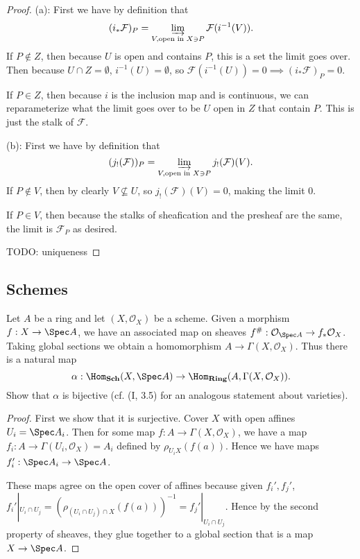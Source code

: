 \begin{proof}
	(a): First we have by definition that
	\[
		(i_\ast \mathcal{F})_P = \varinjlim_{V, \text{open in $X $} \ni P} \mathcal{F}(i^{-1}(V))
	.\] 
	If $P\notin Z $, then because $U $ is open and contains $P $, this is a set the limit goes over.
	Then because $U\cap Z = \emptyset $, $i^{-1}(U) = \emptyset $, so $\mathcal{F}(i^{-1}(U)) = 0 \implies (i_\ast \mathcal{F})_P = 0 $.

	If $P\in Z $, then because $i $ is the inclusion map and is continuous, we can reparameterize what the limit goes over to be $U $ open in $Z $ that contain $P $.
	This is just the stalk of $\mathcal{F} $.

	(b): First we have by definition that
	\[
		(j_! (\mathcal{F}))_P = \varinjlim_{V, \text{open in $X $} \ni P} j_!(\mathcal{F})(V)
	.\] 
	If $P \notin V $, then by clearly $V\not\subseteq U $, so $j_!(\mathcal{F})(V) = 0 $, making the limit $0 $.

	If $P\in V $, then because the stalks of sheafication and the presheaf are the same, the limit is $\mathcal{F}_P $ as desired.

	TODO: uniqueness
\end{proof}

\subsection{Schemes}

\begin{exercise}%
	Let $A $ be a ring and let $(X,\mathcal{O}_X) $ be a scheme. Given a morphism $f: X\to \Spec A $, we have an associated map on sheaves $f^\#: \mathcal{O}_{\Spec A} \to f_\ast \mathcal{O}_X $. Taking global sections we obtain a homomorphism $A\to \Gamma(X,\mathcal{O}_X) $. Thus there is a natural map
	\[
		\alpha: \Hom_{\text{\textbf{Sch}}}(X,\Spec A) \to \Hom_{\text{\textbf{Ring}}}(A,\Gamma(X,\mathcal{O}_X))
	.\] 
	Show that $\alpha $ is bijective (cf. (I, 3.5) for an analogous statement about varieties).
\end{exercise}
\begin{proof}
	First we show that it is surjective.
	Cover $X $ with open affines $U_i = \Spec A_i $.
	Then for some map $f: A\to \Gamma(X,\mathcal{O}_X) $, we have a map $f_i:A\to \Gamma(U_i, \mathcal{O}_X) = A_i $ defined by $\rho_{U_iX}(f(a)) $.
	Hence we have maps $f_i': \Spec A_i \to \Spec A $.

	These maps agree on the open cover of affines because given $f_i',f_j' $, $f_i'|_{U_i \cap U_j} = (\rho_{(U_i\cap U_j)\cap X}(f(a)))^{-1} = f_j'|_{U_i\cap U_j}$.
	Hence by the second property of sheaves, they glue together to a global section that is a map $X\to \Spec A $.
\end{proof}

